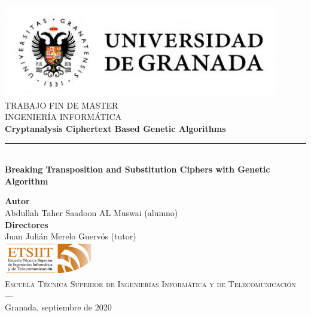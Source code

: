 \begin{titlepage}


\newlength{\centeroffset}
\setlength{\centeroffset}{-0.5\oddsidemargin}
\addtolength{\centeroffset}{0.5\evensidemargin}
\thispagestyle{empty}

\noindent\hspace*{\centeroffset}\begin{minipage}{\textwidth}

\centering
\includegraphics[width=0.9\textwidth]{imagenes/logo_ugr.jpg}\\[1.4cm]

\textsc{ \Large TRABAJO FIN DE MASTER\\[0.2cm]}
\textsc{ INGENIERÍA INFORMÁTICA}\\[1cm]
%
{\LARGE\bfseries Cryptanalysis Ciphertext Based Genetic Algorithms\\
}
\noindent\rule[-1ex]{\textwidth}{3pt}\\[3.5ex]
{\large\bfseries Breaking Transposition and Substitution Ciphers with Genetic Algorithm}
\end{minipage}

\noindent\hspace*{\centeroffset}\begin{minipage}{\textwidth}
\centering
\vspace{0.6cm}
\textbf{Autor}\\ {Abdullah Taher Saadoon AL Muswai (alumno)}\\[2.5ex]
\textbf{Directores}\\{Juan Julián Merelo Guervós (tutor)}\\[2cm]
\includegraphics[width=0.3\textwidth]{imagenes/etsiit_logo.png}\\[0.1cm]
\textsc{Escuela Técnica Superior de Ingenierías Informática y de Telecomunicación}\\
\textsc{---}\\
Granada, septiembre de 2020
\end{minipage}
\end{titlepage}


